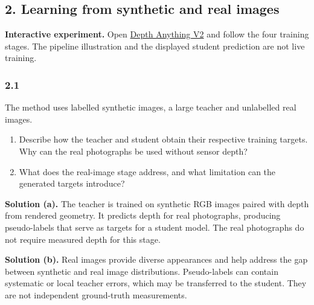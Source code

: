 \documentclass[11pt,a4paper]{article}
\newcommand{\laburl}{https://sosekie.github.io/Unibe-CVG-CV-Interactive-Labs/tutorial-11/}
\newcommand{\lablink}[2]{\href{\laburl\##1}{#2}}
\begin{document}
\subsection*{2. Learning from synthetic and real images}
\noindent\textbf{Interactive experiment.}
Open \lablink{data}{Depth Anything V2} and follow the four training stages.
The pipeline illustration and the displayed student prediction are not live training.
\par\noindent
\begin{minipage}{\linewidth}
\subsubsection*{2.1}
The method uses labelled synthetic images, a large teacher and unlabelled real images.
\begin{enumerate}[label=(\alph*),nosep]
\item Describe how the teacher and student obtain their respective training targets.
Why can the real photographs be used without sensor depth?
\item What does the real-image stage address, and what limitation can the generated targets introduce?
\end{enumerate}
\ifsolutions
\noindent\textbf{Solution (a).}
The teacher is trained on synthetic RGB images paired with depth from rendered geometry.
It predicts depth for real photographs, producing pseudo-labels that serve as targets for a student model.
The real photographs do not require measured depth for this stage.

\noindent\textbf{Solution (b).}
Real images provide diverse appearances and help address the gap between synthetic and real image distributions.
Pseudo-labels can contain systematic or local teacher errors, which may be transferred to the student.
They are not independent ground-truth measurements.
\fi
\end{minipage}
\par\medskip
\par\noindent
\end{document}

